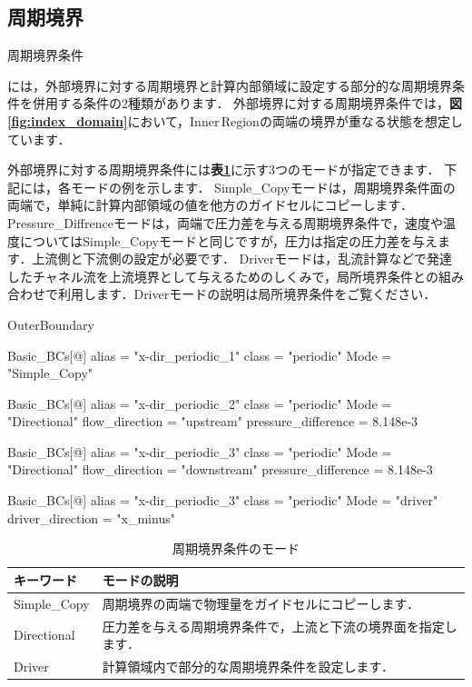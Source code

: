 \pagebreak
\subsection{周期境界}

\hypertarget{tgt:preriodic}{周期境界条件}には，外部境界に対する周期境界と計算内部領域に設定する部分的な周期境界条件を併用する条件の2種類があります．
外部境界に対する周期境界条件では，\textbf{図\ref{fig:index_domain}}において，Inner\,Regionの両端の境界が重なる状態を想定しています．

\vspace{2mm}

外部境界に対する周期境界条件には\textbf{表\ref{tbl:periodic mode}}に示す3つのモードが指定できます．
下記には，各モードの例を示します．
Simple\_Copyモードは，周期境界条件面の両端で，単純に計算内部領域の値を他方のガイドセルにコピーします．
Pressure\_Diffrenceモードは，両端で圧力差を与える周期境界条件で，速度や温度についてはSimple\_Copyモードと同じですが，圧力は指定の圧力差を与えます．上流側と下流側の設定が必要です．
Driverモードは，乱流計算などで発達したチャネル流を上流境界として与えるためのしくみで，局所境界条件との組み合わせで利用します．Driverモードの説明は局所境界条件をご覧ください．

{\small
\begin{program}
OuterBoundary {
  Basic_BCs[@] {
    alias    = "x-dir_periodic_1"
    class    = "periodic"
    Mode     = "Simple_Copy"
  }
  
  Basic_BCs[@] {
    alias    = "x-dir_periodic_2"
    class    = "periodic"
    Mode     = "Directional"
    flow_direction = "upstream"
    pressure_difference = 8.148e-3
  }
  
  Basic_BCs[@] {
    alias    = "x-dir_periodic_3"
    class    = "periodic"
    Mode     = "Directional"
    flow_direction = "downstream"
    pressure_difference = 8.148e-3
  }
  
  Basic_BCs[@] {
    alias    = "x-dir_periodic_3"
    class    = "periodic"
    Mode     = "driver"
    driver_direction = "x_minus"
  }
}
\end{program}
}

\begin{table}[htdp]
\caption{周期境界条件のモード}
\begin{center}
\small
\begin{tabular}{ll} \toprule
キーワード & モードの説明\\ \midrule
Simple\_Copy & 周期境界の両端で物理量をガイドセルにコピーします．\\
Directional  & 圧力差を与える周期境界条件で，上流と下流の境界面を指定します．\\
Driver       & 計算領域内で部分的な周期境界条件を設定します．\\ \bottomrule
\end{tabular}
\end{center}
\label{tbl:periodic mode}
\end{table}

